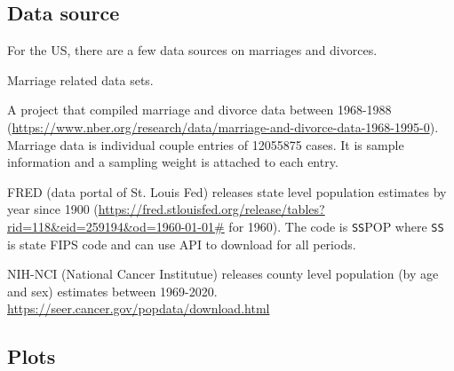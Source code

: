 \subsection{Data source}

For the US, there are a few data sources on marriages and divorces. 
\begin{description}
\vspace{1.0ex}\setlength{\itemsep}{1.0ex}\setlength{\baselineskip}{12pt}
\item[NHGIS (IPUMS)]	Marriage related data sets. 
\item[NBER]	 A project that compiled marriage and divorce data between 1968-1988 {\footnotesize (\url{https://www.nber.org/research/data/marriage-and-divorce-data-1968-1995-0})}. Marriage data is individual couple entries of \num{12055875} cases. It is sample information and a sampling weight is attached to each entry.
\item[FRED]	FRED (data portal of St. Louis Fed) releases state level population estimates by year since 1900 {\footnotesize (\url{https://fred.stlouisfed.org/release/tables?rid=118&eid=259194&od=1960-01-01#} for 1960)}. The code is \texttt{SS}POP where \texttt{SS} is state FIPS code and can use API to download for all periods.
\item[SEER]	NIH-NCI (National Cancer Institutue) releases county level population (by age and sex) estimates between 1969-2020. {\footnotesize\url{https://seer.cancer.gov/popdata/download.html}}
\end{description}


\subsection{Plots}
















